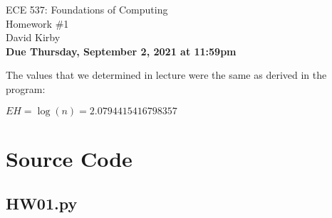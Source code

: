 \documentclass[11pt]{article}
\begin{document}
\begin{center}
\LARGE{ECE 537: Foundations of Computing\\Homework \#1}\\[1.5em]
\large David Kirby\\[1.5em]
\large \textbf{Due Thursday, September 2, 2021 at 11:59pm}\\[2.5em]
\end{center}

\noindent The values that we determined in lecture were the same as derived in the program:\par
$EH = \log(n) = 2.0794415416798357$

\section*{Source Code}
\subsection*{HW01.py}
\inputminted[frame=lines, linenos]{python}{HW01.py}
\end{document}
